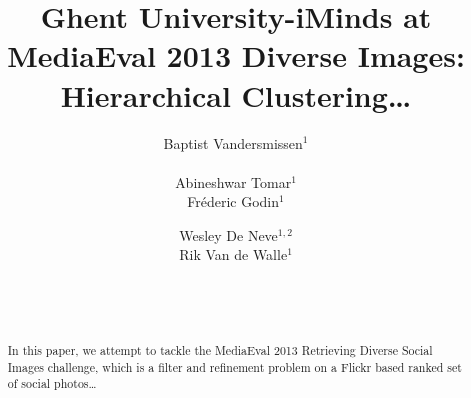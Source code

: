 \documentclass{acm_proc_article-me11_tweaked}
\begin{document}

\title{Ghent University-iMinds at MediaEval 2013 Diverse Images: Hierarchical Clustering\ldots  }

\author{
\alignauthor
Baptist Vandersmissen$^1$\\
\\    
\alignauthor
Abineshwar Tomar$^1$ \\
\alignauthor
Fr\'ederic Godin$^1$\\
\and  %
\alignauthor
Wesley De Neve$^{1,2}$\\
\alignauthor
Rik Van de Walle$^1$\\
\and
\\
\\ 
}
\maketitle
\begin{abstract}
In this paper, we attempt to tackle the MediaEval 2013 Retrieving Diverse Social Images challenge, which is a filter and refinement problem on a Flickr based ranked set of social photos\ldots
\end{abstract}
% 
% 
\end{document}
